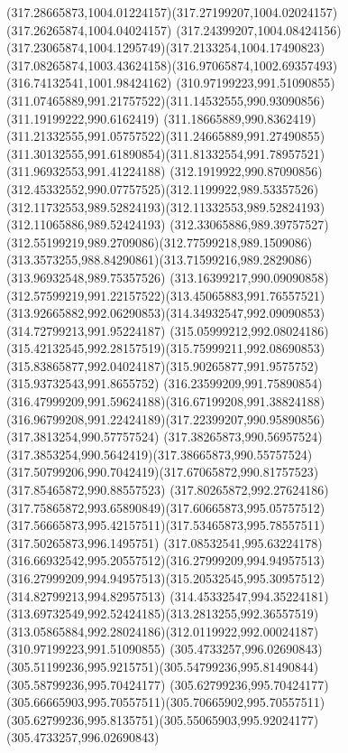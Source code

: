 {    \curveto(317.28665873,1004.01224157)(317.27199207,1004.02024157)(317.26265874,1004.04024157)
    \curveto(317.24399207,1004.08424156)(317.23065874,1004.1295749)(317.2133254,1004.17490823)
    \curveto(317.08265874,1003.43624158)(316.97065874,1002.69357493)(316.74132541,1001.98424162)
    \moveto(310.97199223,991.51090855)
    \curveto(311.07465889,991.21757522)(311.14532555,990.93090856)(311.19199222,990.6162419)
    \curveto(311.18665889,990.8362419)(311.21332555,991.05757522)(311.24665889,991.27490855)
    \curveto(311.30132555,991.61890854)(311.81332554,991.78957521)(311.96932553,991.41224188)
    \curveto(312.1919922,990.87090856)(312.45332552,990.07757525)(312.1199922,989.53357526)
    \curveto(312.11732553,989.52824193)(312.11332553,989.52824193)(312.11065886,989.52424193)
    \curveto(312.33065886,989.39757527)(312.55199219,989.2709086)(312.77599218,989.1509086)
    \curveto(313.3573255,988.84290861)(313.71599216,989.2829086)(313.96932548,989.75357526)
    \curveto(313.16399217,990.09090858)(312.57599219,991.22157522)(313.45065883,991.76557521)
    \curveto(313.92665882,992.06290853)(314.34932547,992.09090853)(314.72799213,991.95224187)
    \curveto(315.05999212,992.08024186)(315.42132545,992.28157519)(315.75999211,992.08690853)
    \curveto(315.83865877,992.04024187)(315.90265877,991.9575752)(315.93732543,991.8655752)
    \curveto(316.23599209,991.75890854)(316.47999209,991.59624188)(316.67199208,991.38824188)
    \curveto(316.96799208,991.22424189)(317.22399207,990.95890856)(317.3813254,990.57757524)
    \curveto(317.38265873,990.56957524)(317.3853254,990.5642419)(317.38665873,990.55757524)
    \curveto(317.50799206,990.7042419)(317.67065872,990.81757523)(317.85465872,990.88557523)
    \curveto(317.80265872,992.27624186)(317.75865872,993.65890849)(317.60665873,995.05757512)
    \curveto(317.56665873,995.42157511)(317.53465873,995.78557511)(317.50265873,996.1495751)
    \curveto(317.08532541,995.63224178)(316.66932542,995.20557512)(316.27999209,994.94957513)
    \curveto(316.27999209,994.94957513)(315.20532545,995.30957512)(314.82799213,994.82957513)
    \curveto(314.45332547,994.35224181)(313.69732549,992.52424185)(313.2813255,992.36557519)
    \curveto(313.05865884,992.28024186)(312.0119922,992.00024187)(310.97199223,991.51090855)
    \moveto(305.4733257,996.02690843)
    \curveto(305.51199236,995.9215751)(305.54799236,995.81490844)(305.58799236,995.70424177)
    \curveto(305.62799236,995.70424177)(305.66665903,995.70557511)(305.70665902,995.70557511)
    \curveto(305.62799236,995.8135751)(305.55065903,995.92024177)(305.4733257,996.02690843)
}
